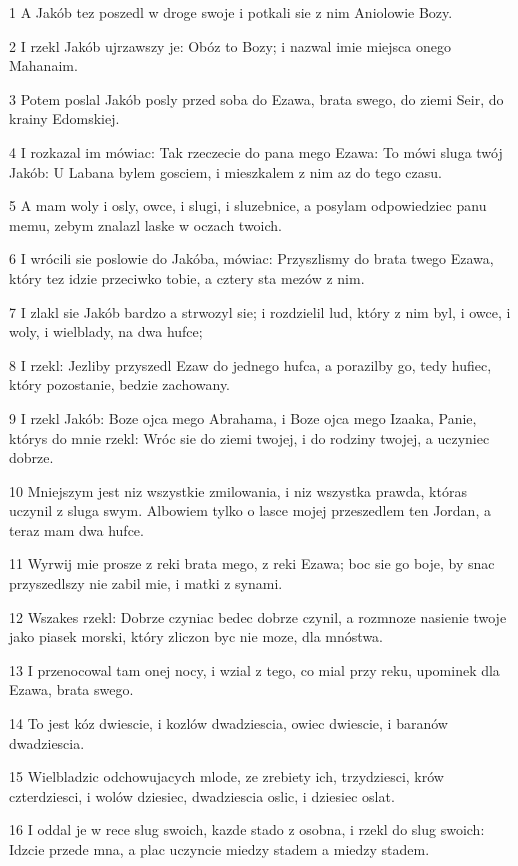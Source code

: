\par 1 A Jakób tez poszedl w droge swoje i potkali sie z nim Aniolowie Bozy.
\par 2 I rzekl Jakób ujrzawszy je: Obóz to Bozy; i nazwal imie miejsca onego Mahanaim.
\par 3 Potem poslal Jakób posly przed soba do Ezawa, brata swego, do ziemi Seir, do krainy Edomskiej.
\par 4 I rozkazal im mówiac: Tak rzeczecie do pana mego Ezawa: To mówi sluga twój Jakób: U Labana bylem gosciem, i mieszkalem z nim az do tego czasu.
\par 5 A mam woly i osly, owce, i slugi, i sluzebnice, a posylam odpowiedziec panu memu, zebym znalazl laske w oczach twoich.
\par 6 I wrócili sie poslowie do Jakóba, mówiac: Przyszlismy do brata twego Ezawa, który tez idzie przeciwko tobie, a cztery sta mezów z nim.
\par 7 I zlakl sie Jakób bardzo a strwozyl sie; i rozdzielil lud, który z nim byl, i owce, i woly, i wielblady, na dwa hufce;
\par 8 I rzekl: Jezliby przyszedl Ezaw do jednego hufca, a porazilby go, tedy hufiec, który pozostanie, bedzie zachowany.
\par 9 I rzekl Jakób: Boze ojca mego Abrahama, i Boze ojca mego Izaaka, Panie, którys do mnie rzekl: Wróc sie do ziemi twojej, i do rodziny twojej, a uczyniec dobrze.
\par 10 Mniejszym jest niz wszystkie zmilowania, i niz wszystka prawda, któras uczynil z sluga swym. Albowiem tylko o lasce mojej przeszedlem ten Jordan, a teraz mam dwa hufce.
\par 11 Wyrwij mie prosze z reki brata mego, z reki Ezawa; boc sie go boje, by snac przyszedlszy nie zabil mie, i matki z synami.
\par 12 Wszakes rzekl: Dobrze czyniac bedec dobrze czynil, a rozmnoze nasienie twoje jako piasek morski, który zliczon byc nie moze, dla mnóstwa.
\par 13 I przenocowal tam onej nocy, i wzial z tego, co mial przy reku, upominek dla Ezawa, brata swego.
\par 14 To jest kóz dwiescie, i kozlów dwadziescia, owiec dwiescie, i baranów dwadziescia.
\par 15 Wielbladzic odchowujacych mlode, ze zrebiety ich, trzydziesci, krów czterdziesci, i wolów dziesiec, dwadziescia oslic, i dziesiec oslat.
\par 16 I oddal je w rece slug swoich, kazde stado z osobna, i rzekl do slug swoich: Idzcie przede mna, a plac uczyncie miedzy stadem a miedzy stadem.

